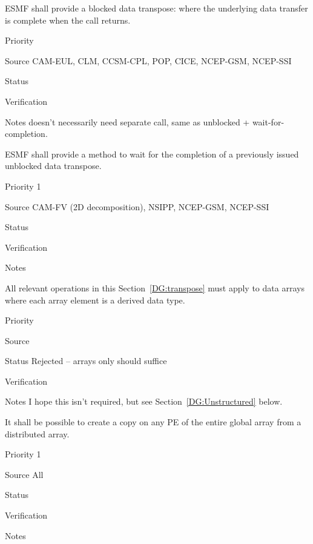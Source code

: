 
ESMF shall provide a blocked data transpose: where the underlying
data transfer is complete when the call returns.

\begin{reqlist}
\item[Priority]
\item[Source] CAM-EUL, CLM, CCSM-CPL, POP, CICE, NCEP-GSM, NCEP-SSI
\item[Status]
\item[Verification]
\item[Notes] doesn't necessarily need separate call, same as unblocked
  + wait-for-completion.
\end{reqlist}


ESMF shall provide a method to wait for the completion of a previously
issued unblocked data transpose.

\begin{reqlist}
\item[Priority] 1
\item[Source] CAM-FV (2D decomposition), NSIPP, NCEP-GSM, NCEP-SSI
\item[Status]
\item[Verification]
\item[Notes]
\end{reqlist}


All relevant operations in this Section~\ref{DG:transpose} must apply to
data arrays where each array element is a derived data type.

\begin{reqlist}
\item[Priority]
\item[Source]
\item[Status] Rejected -- arrays only should suffice
\item[Verification]
\item[Notes] I hope this isn't required, but see
  Section~\ref{DG:Unstructured} below.
\end{reqlist}


It shall be possible to create a copy on any PE of the entire global
array from a distributed array.

\begin{reqlist}
\item[Priority] 1
\item[Source] All
\item[Status]
\item[Verification]
\item[Notes] 
\end{reqlist}

